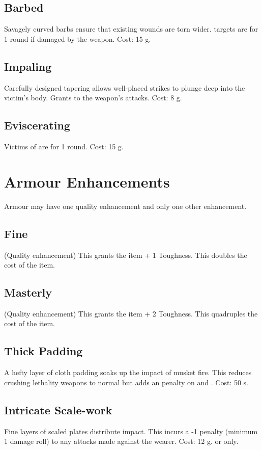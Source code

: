 \subsection{Barbed}
Savagely curved barbs ensure that existing wounds are torn wider.  targets are  for 1 round if damaged by the weapon. Cost: 15 g.

\subsection{Impaling}
Carefully designed tapering allows well-placed strikes to plunge deep into the victim's body. Grants  to the weapon's attacks. Cost: 8 g.

\subsection{Eviscerating}
Victims of  are  for 1 round. Cost: 15 g.


\section{Armour Enhancements}
Armour may have one quality enhancement and only one other enhancement.

\subsection{Fine}
(Quality enhancement) This grants the item + 1 Toughness. This doubles the cost of the item.

\subsection{Masterly}
(Quality enhancement) This grants the item + 2 Toughness. This quadruples the cost of the item.

\subsection{Thick Padding}
A hefty layer of cloth padding soaks up the impact of musket fire. This reduces crushing lethality  weapons to normal  but adds an  penalty on  and . Cost: 50 s.

\subsection{Intricate Scale-work}
Fine layers of scaled plates distribute impact. This incurs a -1  penalty (minimum 1 damage roll) to any attacks made against the wearer. Cost: 12 g.  or  only.

